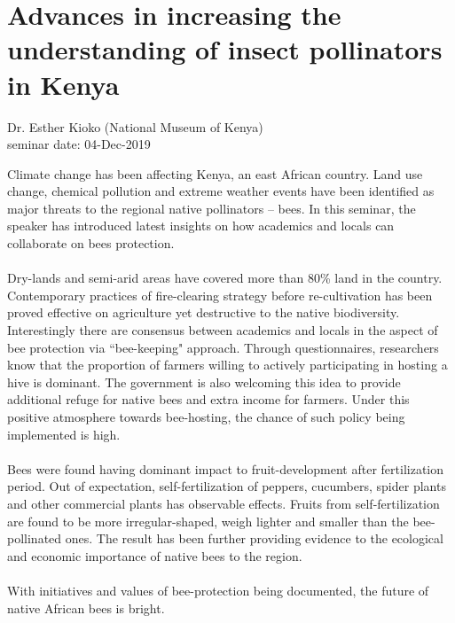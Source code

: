 \documentclass{article}
\begin{document}
    \section{Advances in increasing the understanding of insect pollinators in Kenya}
    \begin{flushright}
        \large{Dr. Esther Kioko (National Museum of Kenya)}\\
        seminar date: 04-Dec-2019
    \end{flushright}
    Climate change has been affecting Kenya, an east African country.  Land use change, chemical pollution and extreme weather events have been identified as major threats to the regional native pollinators -- bees.  In this seminar, the speaker has introduced latest insights on how academics and locals can collaborate on bees protection.\\\\
    Dry-lands and semi-arid areas have covered more than 80\% land in the country.  Contemporary practices of fire-clearing strategy before re-cultivation has been proved effective on agriculture yet destructive to the native biodiversity.  Interestingly there are consensus between academics and locals in the aspect of bee protection via ``bee-keeping" approach.  Through questionnaires, researchers know that the proportion of farmers willing to actively participating in hosting a hive is dominant.  The government is also welcoming this idea to provide additional refuge for native bees and extra income for farmers.  Under this positive atmosphere towards bee-hosting, the chance of such policy being implemented is high.\\\\
    Bees were found having dominant impact to fruit-development after fertilization period.  Out of expectation, self-fertilization of peppers, cucumbers, spider plants and other commercial plants has observable effects.  Fruits from self-fertilization are found to be more irregular-shaped, weigh lighter and smaller than the bee-pollinated ones.  The result has been further providing evidence to the ecological and economic importance of native bees to the region.\\\\
    With initiatives and values of bee-protection being documented, the future of native African bees is bright.
    \clearpage
    
\end{document}
